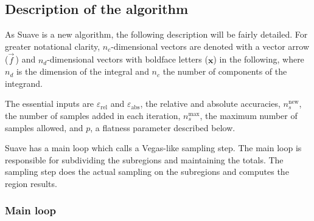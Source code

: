 \documentclass[12pt]{article}
\newcommand\epsabs{\varepsilon_{\text{abs}}}
\newcommand\epsrel{\varepsilon_{\text{rel}}}
\newcommand\nnew{n_s^{\text{new}}}
\newcommand\nmax{n_s^{\text{max}}}
\newcommand\cvec[1]{\vec #1}
\newcommand\dvec[1]{\mathbf{#1}}
\begin{document}
\subsection{Description of the algorithm}

As Suave is a new algorithm, the following description will be fairly
detailed.  For greater notational clarity, $n_c$-dimensional vectors are
denoted with a vector arrow ($\cvec f$\,) and $n_d$-dimensional vectors
with boldface letters ($\dvec x$) in the following, where $n_d$ is the
dimension of the integral and $n_c$ the number of components of the
integrand.

The essential inputs are $\epsrel$ and $\epsabs$, the relative and
absolute accuracies, $\nnew$, the number of samples added in each
iteration, $\nmax$, the maximum number of samples allowed, and $p$, a
flatness parameter described below.

Suave has a main loop which calls a Vegas-like sampling step.  The main
loop is responsible for subdividing the subregions and maintaining the
totals.  The sampling step does the actual sampling on the subregions
and computes the region results.


\subsubsection{Main loop}
\label{sect:suavemain}
\end{document}
